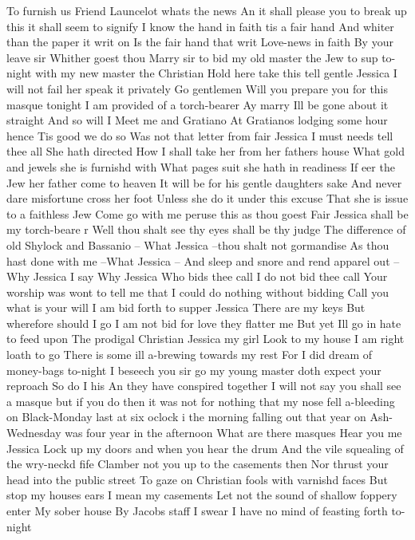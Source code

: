 To furnish us
Friend Launcelot whats the news
An it shall please you to break up
this it shall seem to signify
I know the hand in faith tis a fair hand
And whiter than the paper it writ on
Is the fair hand that writ
Love-news in faith
By your leave sir
Whither goest thou
Marry sir to bid my old master the
Jew to sup to-night with my new master the Christian
Hold here take this tell gentle Jessica
I will not fail her speak it privately
Go gentlemen
Will you prepare you for this masque tonight
I am provided of a torch-bearer
Ay marry Ill be gone about it straight
And so will I
Meet me and Gratiano
At Gratianos lodging some hour hence
Tis good we do so
Was not that letter from fair Jessica
I must needs tell thee all She hath directed
How I shall take her from her fathers house
What gold and jewels she is furnishd with
What pages suit she hath in readiness
If eer the Jew her father come to heaven
It will be for his gentle daughters sake
And never dare misfortune cross her foot
Unless she do it under this excuse
That she is issue to a faithless Jew
Come go with me peruse this as thou goest
Fair Jessica shall be my torch-beare r
Well thou shalt see thy eyes shall be thy judge
The difference of old Shylock and Bassanio --
What Jessica --thou shalt not gormandise
As thou hast done with me --What Jessica --
And sleep and snore and rend apparel out --
Why Jessica I say
Why Jessica
Who bids thee call I do not bid thee call
Your worship was wont to tell me that
I could do nothing without bidding
Call you what is your will
I am bid forth to supper Jessica
There are my keys But wherefore should I go
I am not bid for love they flatter me
But yet Ill go in hate to feed upon
The prodigal Christian Jessica my girl
Look to my house I am right loath to go
There is some ill a-brewing towards my rest
For I did dream of money-bags to-night
I beseech you sir go my young master doth expect
your reproach
So do I his
An they have conspired together I will not say you
shall see a masque but if you do then it was not
for nothing that my nose fell a-bleeding on
Black-Monday last at six oclock i the morning
falling out that year on Ash-Wednesday was four
year in the afternoon
What are there masques Hear you me Jessica
Lock up my doors and when you hear the drum
And the vile squealing of the wry-neckd fife
Clamber not you up to the casements then
Nor thrust your head into the public street
To gaze on Christian fools with varnishd faces
But stop my houses ears I mean my casements
Let not the sound of shallow foppery enter
My sober house By Jacobs staff I swear
I have no mind of feasting forth to-night
